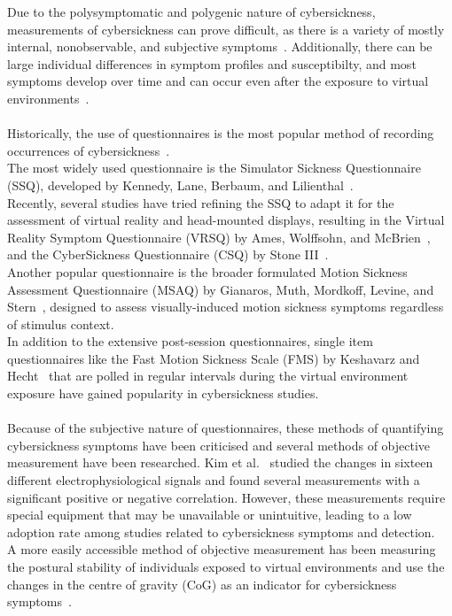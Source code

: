 Due to the polysymptomatic and polygenic nature of cybersickness, measurements of cybersickness can prove
difficult, as there is a variety of mostly internal, nonobservable, and subjective symptoms~\cite{McCauley1992}.
Additionally, there can be large individual differences in symptom profiles and susceptibilty, and most symptoms
develop over time and can occur even after the exposure to virtual environments~\cite{McCauley1992}.
\\
\\
Historically, the use of questionnaires is the most popular method of recording occurrences of
cybersickness~\cite{Rebenitsch2016,Saredakis2020}.
\\
The most widely used questionnaire is the Simulator Sickness Questionnaire (SSQ), developed by Kennedy, Lane, Berbaum,
and Lilienthal~\cite{Kennedy1993}.
\\
Recently, several studies have tried refining the SSQ to adapt it for the assessment of virtual reality and
head-mounted displays, resulting in the Virtual Reality Symptom Questionnaire (VRSQ) by Ames, Wolffsohn, and
McBrien~\cite{Ames2005}, and the CyberSickness Questionnaire (CSQ) by Stone III~\cite{Stone2017}.
\\
Another popular questionnaire is the broader formulated Motion Sickness Assessment Questionnaire (MSAQ) by Gianaros,
Muth, Mordkoff, Levine, and Stern~\cite{Gianaros2001}, designed to assess visually-induced motion sickness symptoms
regardless of stimulus context.
\\
In addition to the extensive post-session questionnaires, single item questionnaires like the Fast Motion Sickness
Scale (FMS) by Keshavarz and Hecht~\cite{Keshavarz2011} that are polled in regular intervals during the virtual
environment exposure have gained popularity in cybersickness studies.
\\
\\
Because of the subjective nature of questionnaires, these methods of quantifying cybersickness symptoms have been
criticised and several methods of objective measurement have been researched.
Kim et al.~\cite{Kim2005} studied the changes in sixteen different electrophysiological signals and found several
measurements with a significant positive or negative correlation.
However, these measurements require special equipment that may be unavailable or unintuitive, leading to a low
adoption rate among studies related to cybersickness symptoms and detection.
\\
A more easily accessible method of objective measurement has been measuring the postural stability of individuals
exposed to virtual environments and use the changes in the centre of gravity (CoG) as an indicator for cybersickness
symptoms~\cite{Lim2020}.



